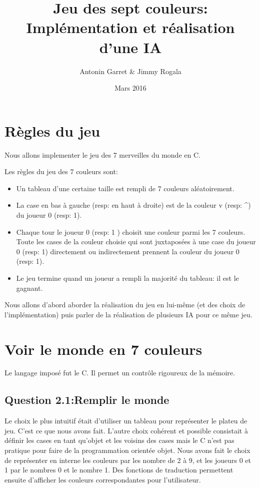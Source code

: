 \documentclass{article}
\title{Jeu des sept couleurs: Implémentation et réalisation d'une IA}
\author{Antonin Garret & Jimmy Rogala}
\date{Mars 2016}
\begin{document}
\tableofcontents
\clearpage
\section{Règles du jeu}
Nous allons implementer le jeu des 7 merveilles du monde en C.

    Les règles du jeu des 7 couleurs sont:
    \begin{itemize} %
      \item Un tableau d'une certaine taille est rempli de 7 couleurs aléatoirement.
      \item La case en bas à gauche (resp: en haut à droite) est de la couleur v (resp: \textasciicircum ) du joueur 0 (resp: 1).
      \item Chaque tour le joueur 0 (resp: 1 ) choisit une couleur parmi les 7 couleurs. Toute les cases de la couleur choisie qui sont juxtaposées à une case du joueur 0 (resp: 1) directement ou indirectement prennent la couleur du joueur 0 (resp: 1).
      \item Le jeu termine quand un joueur a rempli la majorité du tableau: il est le gagnant.
    \end{itemize}

    Nous allons d'abord aborder la réalisation du jeu en lui-même (et des choix de l'implémentation) puis parler de la réalisation de plusieurs IA pour ce même jeu.


\section{Voir le monde en 7 couleurs}
    Le langage imposé fut le C. Il permet un contrôle rigoureux de la mémoire.

    \subsection*{Question 2.1:Remplir le monde}

      Le choix le plus intuitif était d'utiliser un tableau pour représenter le plateu de jeu. C'est ce que nous avons fait. L'autre choix cohérent et possible consistait à définir les cases en tant qu'objet et les voisins des cases mais le C n'est pas pratique pour faire de la programmation orientée objet.
      Nous avons fait le choix de représenter en interne les couleurs par les nombre de 2 à 9, et les joueurs 0 et 1 par le nombres 0 et le nombre 1. Des fonctions de traduction permettent ensuite d'afficher les couleurs correspondantes pour l'utilisateur.
\end{document}
